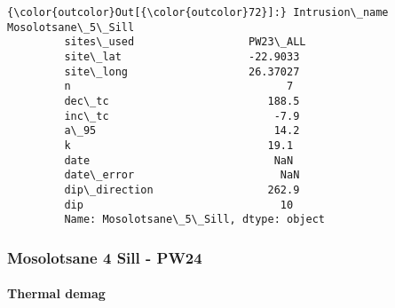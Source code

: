 \documentclass{article}
\begin{document}
            \begin{Verbatim}[commandchars=\\\{\}]
{\color{outcolor}Out[{\color{outcolor}72}]:} Intrusion\_name    Mosolotsane\_5\_Sill
         sites\_used                  PW23\_ALL
         site\_lat                    -22.9033
         site\_long                   26.37027
         n                                  7
         dec\_tc                         188.5
         inc\_tc                          -7.9
         a\_95                            14.2
         k                               19.1
         date                             NaN
         date\_error                       NaN
         dip\_direction                  262.9
         dip                               10
         Name: Mosolotsane\_5\_Sill, dtype: object
\end{Verbatim}
        
    \subsubsection{Mosolotsane 4 Sill -
PW24}\label{mosolotsane-4-sill---pw24}

    \paragraph{Thermal demag}\label{thermal-demag}
\end{document}
